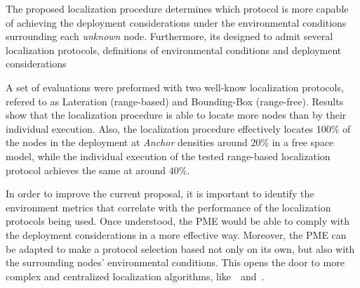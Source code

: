 The proposed localization procedure determines which protocol is more capable of achieving the deployment considerations under the environmental conditions surrounding each \emph{unknown} node. Furthermore, its designed to admit several localization protocols, definitions of environmental conditions and deployment considerations

A set of evaluations were preformed with two well-know localization protocols, refered to as Lateration (range-based) and Bounding-Box (range-free). Results show that the localization procedure is able to locate more nodes than by their individual execution. Also, the localization procedure effectively locates 100\% of the nodes in the deployment at \emph{Anchor} densities around $20$\% in a free space model, while the individual execution of the tested range-based localization protocol achieves the same at around $40$\%.

In order to improve the current proposal, it is important to identify the environment metrics that correlate with the performance of the localization protocols being used. Once understood, the PME would be able to comply with the deployment considerations in a more effective way. Moreover, the PME can be adapted to make a protocol selection based not only on its own, but also with the surrounding nodes' environmental conditions. This opens the door to more complex and centralized localization algorithms, like~\cite{pal2010localization}~and~\cite{alippi2006rssi}.